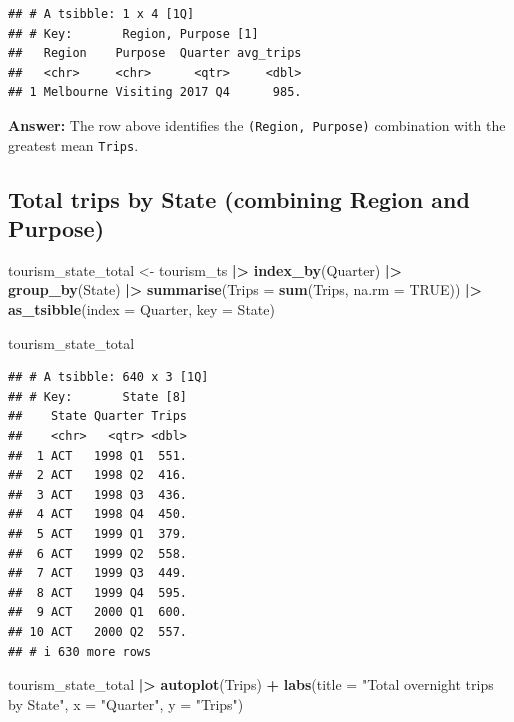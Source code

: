 \documentclass[
  11pt,
]{article}
\newenvironment{Shaded}{\begin{snugshade}}{\end{snugshade}}
\newcommand{\AttributeTok}[1]{\textcolor[rgb]{0.13,0.29,0.53}{#1}}
\newcommand{\ConstantTok}[1]{\textcolor[rgb]{0.56,0.35,0.01}{#1}}
\newcommand{\FunctionTok}[1]{\textcolor[rgb]{0.13,0.29,0.53}{\textbf{#1}}}
\newcommand{\NormalTok}[1]{#1}
\newcommand{\OtherTok}[1]{\textcolor[rgb]{0.56,0.35,0.01}{#1}}
\newcommand{\SpecialCharTok}[1]{\textcolor[rgb]{0.81,0.36,0.00}{\textbf{#1}}}
\newcommand{\StringTok}[1]{\textcolor[rgb]{0.31,0.60,0.02}{#1}}
\begin{document}
\begin{verbatim}
## # A tsibble: 1 x 4 [1Q]
## # Key:       Region, Purpose [1]
##   Region    Purpose  Quarter avg_trips
##   <chr>     <chr>      <qtr>     <dbl>
## 1 Melbourne Visiting 2017 Q4      985.
\end{verbatim}

\textbf{Answer:} The row above identifies the
\texttt{(Region,\ Purpose)} combination with the greatest mean
\texttt{Trips}.

\subsection{Total trips by State (combining Region and
Purpose)}\label{total-trips-by-state-combining-region-and-purpose}

\begin{Shaded}
\begin{Highlighting}[]
\NormalTok{tourism\_state\_total }\OtherTok{\textless{}{-}}\NormalTok{ tourism\_ts }\SpecialCharTok{|\textgreater{}}
  \FunctionTok{index\_by}\NormalTok{(Quarter) }\SpecialCharTok{|\textgreater{}}
  \FunctionTok{group\_by}\NormalTok{(State) }\SpecialCharTok{|\textgreater{}}
  \FunctionTok{summarise}\NormalTok{(}\AttributeTok{Trips =} \FunctionTok{sum}\NormalTok{(Trips, }\AttributeTok{na.rm =} \ConstantTok{TRUE}\NormalTok{)) }\SpecialCharTok{|\textgreater{}}
  \FunctionTok{as\_tsibble}\NormalTok{(}\AttributeTok{index =}\NormalTok{ Quarter, }\AttributeTok{key =}\NormalTok{ State)}

\NormalTok{tourism\_state\_total}
\end{Highlighting}
\end{Shaded}

\begin{verbatim}
## # A tsibble: 640 x 3 [1Q]
## # Key:       State [8]
##    State Quarter Trips
##    <chr>   <qtr> <dbl>
##  1 ACT   1998 Q1  551.
##  2 ACT   1998 Q2  416.
##  3 ACT   1998 Q3  436.
##  4 ACT   1998 Q4  450.
##  5 ACT   1999 Q1  379.
##  6 ACT   1999 Q2  558.
##  7 ACT   1999 Q3  449.
##  8 ACT   1999 Q4  595.
##  9 ACT   2000 Q1  600.
## 10 ACT   2000 Q2  557.
## # i 630 more rows
\end{verbatim}

\begin{Shaded}
\begin{Highlighting}[]
\NormalTok{tourism\_state\_total }\SpecialCharTok{|\textgreater{}}
  \FunctionTok{autoplot}\NormalTok{(Trips) }\SpecialCharTok{+}
  \FunctionTok{labs}\NormalTok{(}\AttributeTok{title =} \StringTok{"Total overnight trips by State"}\NormalTok{, }\AttributeTok{x =} \StringTok{"Quarter"}\NormalTok{, }\AttributeTok{y =} \StringTok{"Trips"}\NormalTok{)}
\end{Highlighting}
\end{Shaded}
\end{document}
